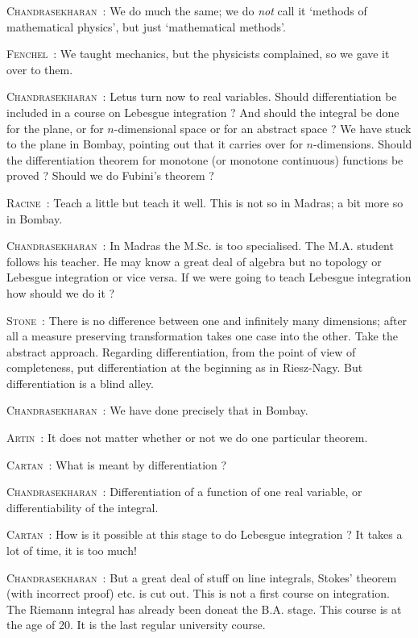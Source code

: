 \smallskip
\noindent
\textsc{Chandrasekharan}~: We do much the same; we do {\em not} call it `methods of mathematical physics', but just `mathematical methods'.

\smallskip
\noindent
\textsc{Fenchel}~: We taught mechanics, but the physicists complained, so we gave it over to them.

\smallskip
\noindent
\textsc{Chandrasekharan}~: Let\pageoriginale us turn now to real variables. Should differentiation be included in a course on Lebesgue integration ? And should the integral be done for the plane, or for $n$-dimensional space or for an abstract space ? We have stuck to the plane in Bombay, pointing out that it carries over for $n$-dimensions. Should the differentiation theorem for monotone (or monotone continuous) functions be proved ? Should we do Fubini's theorem ?

\smallskip
\noindent
\textsc{Racine}~: Teach a little but teach it well. This is not so in Madras; a bit more so in Bombay.

\smallskip
\noindent
\textsc{Chandrasekharan}~: In Madras the M.Sc. is too specialised.  The M.A. student follows his teacher. He may know a great deal of algebra but no topology or Lebesgue integration or vice versa. If we were going to teach Lebesgue integration how should we do it ?

\smallskip
\noindent
\textsc{Stone}~: There is no difference between one and infinitely many dimensions; after all a measure preserving transformation takes one case into the other. Take the abstract approach. Regarding differentiation, from the point of view of completeness, put differentiation at the beginning as in Riesz-Nagy. But differentiation is a blind alley.

\smallskip
\noindent
\textsc{Chandrasekharan}~: We have done precisely that in Bombay.

\smallskip
\noindent
\textsc{Artin}~: It does not matter whether or not we do one particular theorem.

\smallskip
\noindent
\textsc{Cartan}~: What is meant by differentiation ?

\smallskip
\noindent
\textsc{Chandrasekharan}~: Differentiation of a function of one real variable, or differentiability of the integral.

\smallskip
\noindent
\textsc{Cartan}~: How is it possible at this stage to do Lebesgue integration ? It takes a lot of time, it is too much!

\smallskip
\noindent
\textsc{Chandrasekharan}~: But a great deal of stuff on line integrals, Stokes' theorem (with incorrect proof) etc. is cut out. This is not a first course on integration. The Riemann integral has already been done\pageoriginale at the B.A. stage. This course is at the age of 20. It is the last regular university course.

